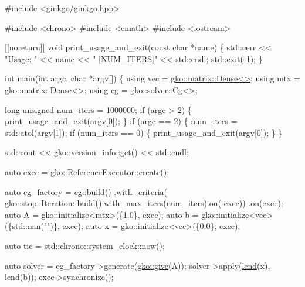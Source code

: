 \begin{DoxyCode}
\textcolor{preprocessor}{#include <ginkgo/ginkgo.hpp>}


\textcolor{preprocessor}{#include <chrono>}
\textcolor{preprocessor}{#include <cmath>}
\textcolor{preprocessor}{#include <iostream>}


[[noreturn]] \textcolor{keywordtype}{void} print\_usage\_and\_exit(\textcolor{keyword}{const} \textcolor{keywordtype}{char} *name)
\{
    std::cerr << \textcolor{stringliteral}{"Usage: "} << name << \textcolor{stringliteral}{" [NUM\_ITERS]"} << std::endl;
    std::exit(-1);
\}


\textcolor{keywordtype}{int} main(\textcolor{keywordtype}{int} argc, \textcolor{keywordtype}{char} *argv[])
\{
    \textcolor{keyword}{using} vec = \hyperlink{classgko_1_1matrix_1_1Dense}{gko::matrix::Dense<>};
    \textcolor{keyword}{using} mtx = \hyperlink{classgko_1_1matrix_1_1Dense}{gko::matrix::Dense<>};
    \textcolor{keyword}{using} cg = \hyperlink{classgko_1_1solver_1_1Cg}{gko::solver::Cg<>};

    \textcolor{keywordtype}{long} \textcolor{keywordtype}{unsigned} num\_iters = 1000000;
    \textcolor{keywordflow}{if} (argc > 2) \{
        print\_usage\_and\_exit(argv[0]);
    \}
    \textcolor{keywordflow}{if} (argc == 2) \{
        num\_iters = std::atol(argv[1]);
        \textcolor{keywordflow}{if} (num\_iters == 0) \{
            print\_usage\_and\_exit(argv[0]);
        \}
    \}

    std::cout << \hyperlink{classgko_1_1version__info_a6daeb8a087cfb57fa055526fc133d8eb}{gko::version\_info::get}() << std::endl;

    \textcolor{keyword}{auto} exec = gko::ReferenceExecutor::create();

    \textcolor{keyword}{auto} cg\_factory =
        cg::build()
            .with\_criteria(
                gko::stop::Iteration::build().with\_max\_iters(num\_iters).on(
                    exec))
            .on(exec);
    \textcolor{keyword}{auto} A = gko::initialize<mtx>(\{1.0\}, exec);
    \textcolor{keyword}{auto} b = gko::initialize<vec>(\{std::nan(\textcolor{stringliteral}{""})\}, exec);
    \textcolor{keyword}{auto} x = gko::initialize<vec>(\{0.0\}, exec);

    \textcolor{keyword}{auto} tic = std::chrono::system\_clock::now();

    \textcolor{keyword}{auto} solver = cg\_factory->generate(\hyperlink{namespacegko_acbd3fd6d07e498892881e8e2ab0b4167}{gko::give}(A));
    solver->apply(\hyperlink{namespacegko_aa8cb4876b72e5e1036ea9575443c439b}{lend}(x), \hyperlink{namespacegko_aa8cb4876b72e5e1036ea9575443c439b}{lend}(b));
    exec->synchronize();


\end{DoxyCode}
